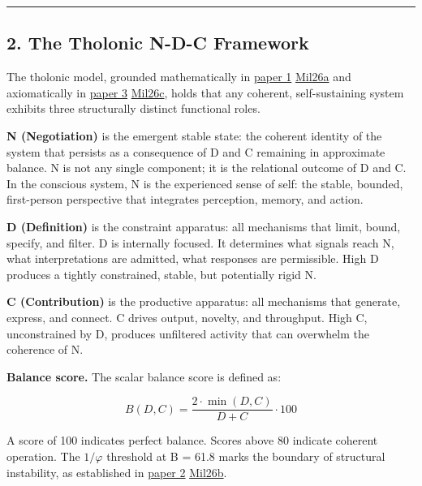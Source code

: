 \documentclass[
  11pt,
  letterpaper,
]{article}
\begin{document}
\begin{center}\rule{0.5\linewidth}{0.5pt}\end{center}

\subsection{2. The Tholonic N-D-C
Framework}\label{the-tholonic-n-d-c-framework}

The tholonic model, grounded mathematically in
\href{https://github.com/baardev/truevalue/blob/main/docnav/Research/papers/1_recursive-tholonic-five-constants/1_recursive-tholonic-five-constants.pdf}{paper
1}
\href{https://github.com/baardev/truevalue/blob/main/docnav/Research/papers/1_recursive-tholonic-five-constants/1_recursive-tholonic-five-constants.pdf}{Mil26a}
and axiomatically in
\href{https://github.com/baardev/truevalue/blob/main/docnav/Research/papers/3_minimal-recursive-triadic-framework/3_minimal-recursive-triadic-framework.pdf}{paper
3}
\href{https://github.com/baardev/truevalue/blob/main/docnav/Research/papers/3_minimal-recursive-triadic-framework/3_minimal-recursive-triadic-framework.pdf}{Mil26c},
holds that any coherent, self-sustaining system exhibits three
structurally distinct functional roles.

\textbf{N (Negotiation)} is the emergent stable state: the coherent
identity of the system that persists as a consequence of D and C
remaining in approximate balance. N is not any single component; it is
the relational outcome of D and C. In the conscious system, N is the
experienced sense of self: the stable, bounded, first-person perspective
that integrates perception, memory, and action.

\textbf{D (Definition)} is the constraint apparatus: all mechanisms that
limit, bound, specify, and filter. D is internally focused. It
determines what signals reach N, what interpretations are admitted, what
responses are permissible. High D produces a tightly constrained,
stable, but potentially rigid N.

\textbf{C (Contribution)} is the productive apparatus: all mechanisms
that generate, express, and connect. C drives output, novelty, and
throughput. High C, unconstrained by D, produces unfiltered activity
that can overwhelm the coherence of N.

\textbf{Balance score.} The scalar balance score is defined as:

\[B(D,C) = \frac{2 \cdot \min(D,C)}{D + C} \cdot 100\]

A score of 100 indicates perfect balance. Scores above 80 indicate
coherent operation. The \(1/\varphi\) threshold at B = 61.8 marks the
boundary of structural instability, as established in
\href{https://github.com/baardev/truevalue/blob/main/docnav/Research/papers/2_supply-chain-transparency-tvpci/2_supply-chain-transparency-tvpci.pdf}{paper
2}
\href{https://github.com/baardev/truevalue/blob/main/docnav/Research/papers/2_supply-chain-transparency-tvpci/2_supply-chain-transparency-tvpci.pdf}{Mil26b}.
\end{document}
